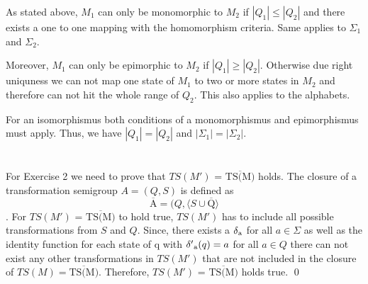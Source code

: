 \documentclass[a4paper,12pt,numbers=noenddot]{scrreport}
\def\lsk{\left<}
\def\rsk{\right>}
\begin{document}
\vspace{1cm}
As stated above, $M_1$ can only be monomorphic to $M_2$ if $|Q_1| \leq |Q_2|$ and there exists a one to one mapping with the homomorphism criteria.
Same applies to $\Sigma_1$ and $\Sigma_2$.

Moreover, $M_1$ can only be epimorphic to $M_2$ if $|Q_1| \geq |Q_2|$.
Otherwise due right uniquness we can not map one state of $M_1$ to two or more states in $M_2$ and therefore can not hit the whole range of $Q_2$.
This also applies to the alphabets.

For an isomorphismus both conditions of a monomorphismus and epimorphismus must apply. Thus, we have $|Q_1| = |Q_2|$ and $|\Sigma_1| = |\Sigma_2|$.
\section{}

For Exercise 2 we need to prove that $TS(M')$ = $\overline{\mbox{TS(M)}}$ holds. The closure of a transformation semigroup $A = (Q, S)$ is defined as 
\begin{equation}
    \overline{\mbox{A}} = (Q, \langle S \cup \overline{\mbox{Q}} \rangle
\end{equation}
.
For $TS(M')$ = $\overline{\mbox{TS(M)}}$ to hold true, $TS(M')$ has to include all possible transformations from $S$ and $Q$. Since, there exists a $\delta\textsubscript{a}$ for all $a \in \Sigma$ as well as the identity function for each state of q with $\delta'\textsubscript{a}(q) = a$ for all $a \in Q$ there can not exist any other transformations in $TS(M')$ that are not included in the closure of $TS(M) = \overline{\mbox{TS(M)}}$. Therefore, $TS(M')$ = $\overline{\mbox{TS(M)}}$ holds true.
\qed

%
%
\end{document}
